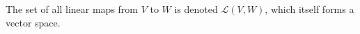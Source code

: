\documentclass[preview]{standalone}
\begin{document}
\begin{center}
The set of all linear maps from $V$ to $W$ is denoted $\mathcal{L}(V,W)$, which itself forms a vector space.
\end{center}
\end{document}
